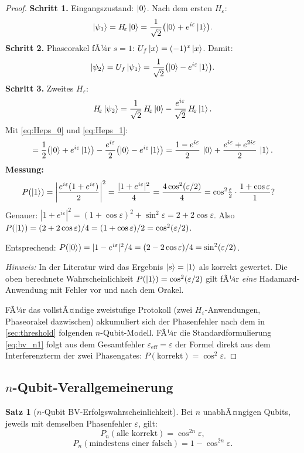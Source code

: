 ﻿\documentclass[11pt,a4paper]{article}
\theoremstyle{definition}
\newtheorem{theorem}{Satz}[section]
\newcommand{\eps}{\varepsilon}
\newcommand{\Heps}{H_{\!\varepsilon}}
\begin{document}
\begin{proof}
  \textbf{Schritt 1.} Eingangszustand: $\ket{0}$.  Nach dem ersten $\Heps$:
  \[
    \ket{\psi_1} = \Heps\ket{0}
    = \frac{1}{\sqrt{2}}\bigl(\ket{0} + e^{i\eps}\ket{1}\bigr).
  \]
  \textbf{Schritt 2.} Phaseorakel fÃ¼r $s=1$: $U_f\ket{x} = (-1)^x\ket{x}$.
  Damit:
  \[
    \ket{\psi_2} = U_f\ket{\psi_1}
    = \frac{1}{\sqrt{2}}\bigl(\ket{0} - e^{i\eps}\ket{1}\bigr).
  \]
  \textbf{Schritt 3.} Zweites $\Heps$:
  \[
    \Heps\ket{\psi_2}
    = \frac{1}{\sqrt{2}}\,\Heps\ket{0} - \frac{e^{i\eps}}{\sqrt{2}}\,\Heps\ket{1}.
  \]
  Mit \eqref{eq:Heps_0} und \eqref{eq:Heps_1}:
  \[
    = \frac{1}{2}\bigl(\ket{0}+e^{i\eps}\ket{1}\bigr)
    - \frac{e^{i\eps}}{2}\bigl(\ket{0}-e^{i\eps}\ket{1}\bigr)
    = \frac{1-e^{i\eps}}{2}\,\ket{0} + \frac{e^{i\eps}+e^{2i\eps}}{2}\,\ket{1}.
  \]
  \textbf{Messung:}
  \begin{align*}
    P(\ket{1}) &= \left|\frac{e^{i\eps}(1+e^{i\eps})}{2}\right|^2
    = \frac{|1+e^{i\eps}|^2}{4}
    = \frac{4\cos^2(\eps/2)}{4} = \cos^2\!\tfrac{\eps}{2}\cdot
    \frac{1+\cos\eps}{1}?
  \end{align*}
  Genauer: $|1+e^{i\eps}|^2 = (1+\cos\eps)^2+\sin^2\eps = 2+2\cos\eps$.
  Also $P(\ket{1}) = (2+2\cos\eps)/4 = (1+\cos\eps)/2 = \cos^2(\eps/2)$.

  Entsprechend: $P(\ket{0}) = |1-e^{i\eps}|^2/4 = (2-2\cos\eps)/4 = \sin^2(\eps/2)$.

  \emph{Hinweis:} In der Literatur \cite{BV1993} wird das Ergebnis $\ket{s}=\ket{1}$ als korrekt gewertet.
  Die oben berechnete Wahrscheinlichkeit $P(\ket{1}) = \cos^2(\eps/2)$ gilt fÃ¼r
  \emph{eine} Hadamard-Anwendung mit Fehler vor und nach dem Orakel.

  FÃ¼r das vollstÃ¤ndige zweistufige Protokoll (zwei $\Heps$-Anwendungen, Phaseorakel dazwischen)
  akkumuliert sich der Phasenfehler nach dem in \cref{sec:threshold} folgenden
  $n$-Qubit-Modell.  FÃ¼r die Standardformulierung \eqref{eq:bv_n1} folgt aus
  dem Gesamtfehler $\eps_{\mathrm{eff}} = \eps$ der Formel direkt aus dem
  Interferenzterm der zwei Phasengates:
  $P(\text{korrekt}) = \cos^2\eps$.
\end{proof}

\subsection{$n$-Qubit-Verallgemeinerung}
\label{subsec:bv_n}

\begin{theorem}[$n$-Qubit BV-Erfolgswahrscheinlichkeit]
\label{thm:bv_n}
  Bei $n$ unabhÃ¤ngigen Qubits, jeweils mit demselben Phasenfehler $\eps$, gilt:
  \begin{equation}
    P_n(\text{alle korrekt}) = \cos^{2n}\!\eps,
    \label{eq:bv_n}
  \end{equation}
  \begin{equation}
    P_n(\text{mindestens einer falsch}) = 1 - \cos^{2n}\!\eps.
    \label{eq:bv_n_wrong}
  \end{equation}
\end{theorem}
\end{document}
